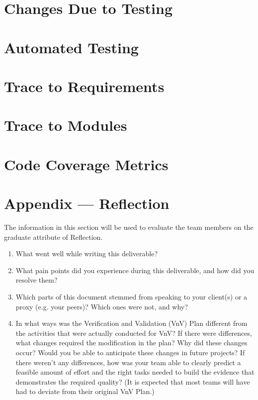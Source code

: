 \documentclass[12pt, titlepage]{article}
\begin{document}
\section{Changes Due to Testing}


\section{Automated Testing}
		
\section{Trace to Requirements}
		
\section{Trace to Modules}		

\section{Code Coverage Metrics}




\newpage{}
\section*{Appendix --- Reflection}

The information in this section will be used to evaluate the team members on the
graduate attribute of Reflection.



\begin{enumerate}
  \item What went well while writing this deliverable? 
  \item What pain points did you experience during this deliverable, and how
    did you resolve them?
  \item Which parts of this document stemmed from speaking to your client(s) or
  a proxy (e.g. your peers)? Which ones were not, and why?
  \item In what ways was the Verification and Validation (VnV) Plan different
  from the activities that were actually conducted for VnV?  If there were
  differences, what changes required the modification in the plan?  Why did
  these changes occur?  Would you be able to anticipate these changes in future
  projects?  If there weren't any differences, how was your team able to clearly
  predict a feasible amount of effort and the right tasks needed to build the
  evidence that demonstrates the required quality?  (It is expected that most
  teams will have had to deviate from their original VnV Plan.)
\end{enumerate}
\end{document}
